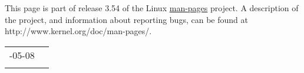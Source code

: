 \documentclass[]{article}
\renewcommand{\emph}[1]{\underline{#1}}
\begin{document}

This page is part of release 3.54 of the Linux \emph{man-pages} project.
A description of the project, and information about reporting bugs, can
be found at http://www.kernel.org/doc/man-pages/.

\begin{longtable}[c]{@{}ll@{}}
\toprule\addlinespace
2012-05-08 &
\\\addlinespace
\bottomrule
\end{longtable}
\end{document}
